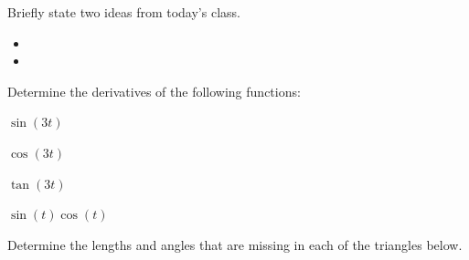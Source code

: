 \begin{problem}
\item Briefly state two ideas from today's class.
  \begin{itemize}
  \item 
  \item 
  \end{itemize}
\item 
  \begin{subproblem}
    \item
  \end{subproblem}
\end{problem}


\begin{problem}
\item Determine the derivatives of the following functions:
  \begin{subproblem}
  \item $\sin(3t)$
    \vfill
  \item $\cos(3t)$
    \vfill
  \item $\tan(3t)$
    \vfill
  \item $\sin(t)\cos(t)$
    \vfill
  \end{subproblem}

  \clearpage

\item Determine the lengths and angles that are missing in each of the
  triangles below.

  \scalebox{0.5}{}

  \vfill

\end{problem}


